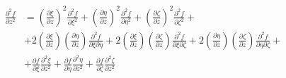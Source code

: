 \documentclass
[
a4paper,                      %
twoside,					  %
12pt,                         %
abstract,		      %
fleqn,                        %
]
{scrartcl} %
\begin{document}
\begin{description}
\begin{equation}
\begin{aligned}
\frac{\partial^{2} f}{\partial z^{2}}&=\left(\frac{\partial\xi}{\partial z}\right)^{2}\frac{\partial^{2} f}{\partial\xi^{2}}+\left(\frac{\partial\eta}{\partial z}\right)^{2}\frac{\partial^{2} f}{\partial\eta^{2}}+\left(\frac{\partial\zeta}{\partial z}\right)^{2}\frac{\partial^{2} f}{\partial\zeta^{2}}+\\[5pt]
&+2\left(\frac{\partial\xi}{\partial z}\right)\left(\frac{\partial\eta}{\partial z}\right)\frac{\partial^{2} f}{\partial\xi\partial\eta}+2\left(\frac{\partial\xi}{\partial z}\right)\left(\frac{\partial\zeta}{\partial z}\right)\frac{\partial^{2} f}{\partial\xi\partial\zeta}+2\left(\frac{\partial\eta}{\partial z}\right)\left(\frac{\partial\zeta}{\partial z}\right)\frac{\partial^{2} f}{\partial\eta\partial\zeta}+\\[5pt]
&+\frac{\partial f}{\partial\xi}\frac{\partial^{2}\xi}{\partial z^{2}}+\frac{\partial f}{\partial\eta}\frac{\partial^{2}\eta}{\partial z^{2}}+\frac{\partial f}{\partial\zeta}\frac{\partial^{2}\zeta}{\partial z^{2}}\\
\end{aligned}
\end{equation}


\end{description}
\end{document}

